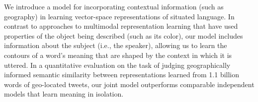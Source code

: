 We introduce a model for incorporating contextual information (such as geography) in learning vector-space representations of situated language. In contrast to approaches to multimodal representation learning that have used properties of the object being described (such as its color), our model includes information about the subject (i.e., the speaker), allowing us to learn the contours of a word's meaning that are shaped by the context in which it is uttered. In a quantitative evaluation on the task of judging geographically informed semantic similarity between representations learned from 1.1 billion words of geo-located tweets, our joint model outperforms comparable independent models that learn meaning in isolation.
